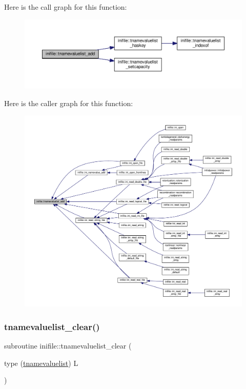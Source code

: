Here is the call graph for this function\+:
\nopagebreak
\begin{figure}[H]
\begin{center}
\leavevmode
\includegraphics[width=350pt]{namespaceinifile_a71aeaf793bb8c4435154a6e8e52bdfaf_cgraph}
\end{center}
\end{figure}
Here is the caller graph for this function\+:
\nopagebreak
\begin{figure}[H]
\begin{center}
\leavevmode
\includegraphics[width=350pt]{namespaceinifile_a71aeaf793bb8c4435154a6e8e52bdfaf_icgraph}
\end{center}
\end{figure}
\mbox{\label{namespaceinifile_a06106a843a985f0a3a97ecff6fb2b339}} 
\subsubsection{\texorpdfstring{tnamevaluelist\+\_\+clear()}{tnamevaluelist\_clear()}}
{\footnotesize\ttfamily subroutine inifile\+::tnamevaluelist\+\_\+clear (\begin{DoxyParamCaption}\item[{type (\mbox{\hyperlink{structinifile_1_1tnamevaluelist}{tnamevaluelist}})}]{L }\end{DoxyParamCaption})}



